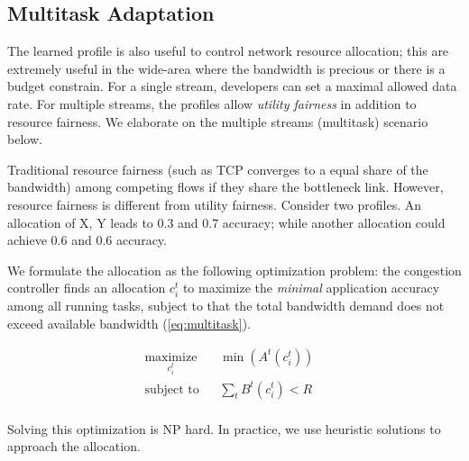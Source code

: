 \subsection{Multitask Adaptation}
\label{sec:multitask-adaptation}

The learned profile is also useful to control network resource allocation; this
are extremely useful in the wide-area where the bandwidth is precious or there
is a budget constrain. For a single stream, developers can set a maximal allowed
data rate. For multiple streams, the profiles allow \textit{utility fairness} in
addition to resource fairness. We elaborate on the multiple streams (multitask)
scenario below.

Traditional resource fairness (such as TCP converges to a equal share of the
bandwidth) among competing flows if they share the bottleneck link. However,
resource fairness is different from utility fairness. Consider two profiles.  An
allocation of X, Y leads to 0.3 and 0.7 accuracy; while another allocation could
achieve 0.6 and 0.6 accuracy.

We formulate the allocation as the following optimization problem: the
congestion controller finds an allocation $c_i^t$ to maximize the
\textit{minimal} application accuracy among all running tasks, subject to that
the total bandwidth demand does not exceed available bandwidth
(\autoref{eq:multitask}).

\begin{equation}
  \label{eq:multitask}
  \begin{aligned}
    & \underset{c_i^t}{\text{maximize}} & & \min({A^t(c_i^t)}) & & \\
    & \text{subject to} & & \sum_t{B^t(c_i^t)} < R & & \\
  \end{aligned}
\end{equation}

Solving this optimization is NP hard. In practice, we use heuristic solutions to
approach the allocation.

\newpage

